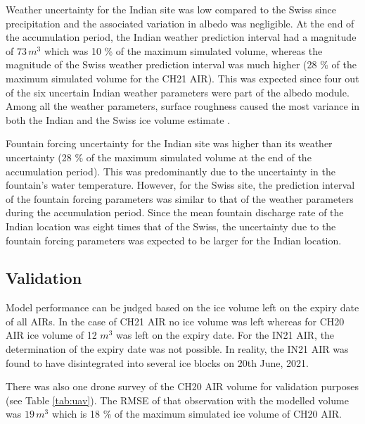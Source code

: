 \documentclass[utf8]{frontiersSCNS}
\begin{document}
Weather uncertainty for the Indian site was low compared to the Swiss since precipitation and the associated
variation in albedo was negligible. At the end of the accumulation period, the Indian weather prediction
interval had a magnitude of  $73\,m^3$ which was 10 \% of the maximum simulated volume, whereas the magnitude of
the Swiss weather prediction interval was much higher (28 \% of the maximum simulated volume for the CH21 AIR).
This was expected since four out of the six uncertain Indian weather parameters were part of the albedo module. Among
all the weather parameters, surface roughness caused the most variance in both the Indian and the Swiss ice
volume estimate .

Fountain forcing uncertainty for the Indian site was higher than its weather uncertainty (28 \% of the maximum
simulated volume at the end of the accumulation period). This was predominantly due to the uncertainty in the
fountain's water temperature. However, for the Swiss site, the prediction interval of the fountain forcing
parameters was similar to that of the weather parameters during the accumulation period. Since the mean fountain
discharge rate of the Indian location was eight times that of the Swiss, the uncertainty due to the fountain
forcing parameters was expected to be larger for the Indian location.

\subsection{Validation}

Model performance can be judged based on the ice volume left on the expiry date of all AIRs. In the case of CH21
AIR no ice volume was left whereas for CH20 AIR ice volume of 12 $m^3$ was left on the expiry date. For the IN21
AIR, the determination of the expiry date was not possible. In reality, the IN21 AIR was found to have
disintegrated into several ice blocks on 20th June, 2021. 

There was also one drone survey of the CH20 AIR volume for validation purposes (see Table \ref{tab:uav}). The
RMSE of that observation with the modelled volume was $19\, m^3$ which is 18 \% of the maximum simulated ice
volume of CH20 AIR.
\end{document}
